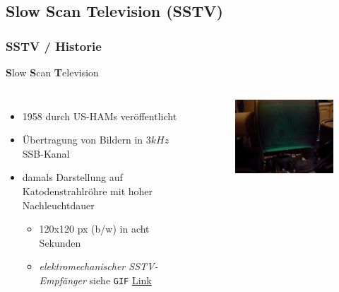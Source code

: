 \subsection[SSTV]{Slow Scan Television (SSTV)}

\begin{frame}
  \frametitle{SSTV / Historie}

  \textbf{S}low \textbf{S}can \textbf{T}elevision\\[1.5em]

  \begin{columns}[c]
    \begin{itemize}
      \item 1958 durch US-HAMs veröffentlicht
      \item Übertragung von Bildern in $3 kHz$ SSB-Kanal
      \item damals Darstellung auf Katodenstrahlröhre mit hoher Nachleuchtdauer
        \begin{itemize}
          \item 120x120 px (b/w) in acht Sekunden
          \item \emph{elektromechanischer SSTV-Empfänger} siehe \texttt{GIF}
            \href{https://upload.wikimedia.org/wikipedia/commons/1/1e/Mechanical_glow_drum_slow_scan_television_monitor.gif}{\ExternalLink Link}
        \end{itemize}
    \end{itemize}
    \begin{center}
      \begin{figure}
        \includegraphics[width=.9\textwidth,height=.75\textheight,keepaspectratio]{e16/Mechanical_glow_drum_slow_scan_television_monitor.jpg}
      \end{figure}
    \end{center}
  \end{columns}

\end{frame}

